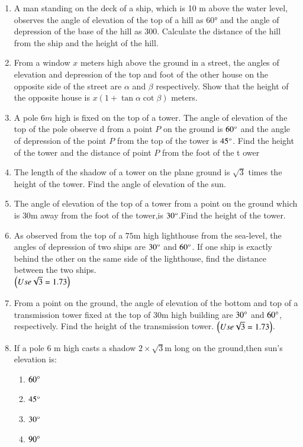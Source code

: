 \begin{enumerate}[label=\thesubsection.\arabic*.,ref=\thesubsection.\theenumi]
\item A man standing on the deck of a ship, which is 10 m above the water level, observes the
angle of elevation of the top of a hill as 60° and the angle of depression of the base of the hill as
300. Calculate the distance of the hill from the ship and the height of the hill.

\hfill{}\item From a window $x$ meters high above the ground in a street, the angles of elevation and depression of the top and foot of the other house on the opposite side of the street are $\alpha$ and $\beta$ respectively. Show that the height of the opposite house is $x(1 + \tan \alpha \cot \beta)$ meters.

\hfill{}

\item A pole $6m$ high is fixed on the top of a tower. The angle of elevation of the top of the pole observe
d from a point $P$ on the ground is $60\degree$ and the angle of depression of the point $P$ from the top of
 the tower is $45\degree$. Find the height of the tower and the distance of point $P$ from the foot of the t
ower
\hfill{}

\item The length of the shadow of a tower on the plane ground is $ \sqrt3 $ times the height of the tower. Find the angle of elevation of the sun.

\hfill{}\item The angle of elevation of the top of a tower from a point on the ground which is $30 \mathrm{m}$ away from the foot of the tower,is $30\degree$.Find the height of the tower.
\hfill{}

\item As observed from the top of a $75 \mathrm{m}$ high lighthouse from the sea-level, the angles of depression of two ships are $30\degree$ and $60\degree$. If one ship is exactly behind the other on the same side of the lighthouse, find the distance between the two ships.\\
	$\left(Use \sqrt{3} = 1.73\right)$

\hfill{}\item From a point on the ground, the angle of elevation of the bottom and top of a transmission tower fixed at the top of $30 \mathrm{m}$ high building are $30\degree$ and $60\degree$, respectively. Find the height of the transmission tower. $\left(Use\sqrt{3} = 1.73\right)$.
	\hfill{}\item If a pole 6 m high casts a shadow $2 \times \sqrt{3}$m long on the ground,then sun's elevation is:
	\begin{enumerate}
\item $60\degree$
\item $45\degree$
\item $30\degree$
\item $90\degree$
	\end{enumerate}
 \hfill{}


\end{enumerate}
